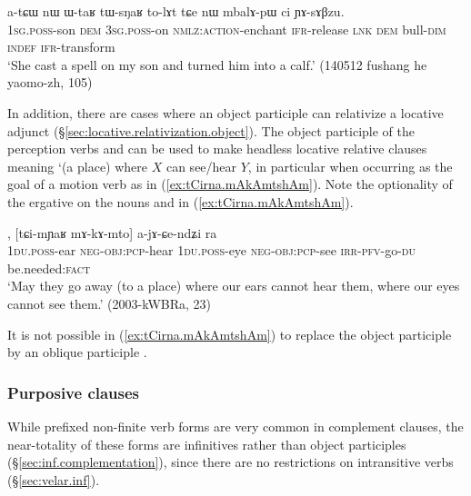 \begin{exe}
\ex \label{ex:WtaR.tWsNaR.tolAt}
\gll  a-tɕɯ nɯ ɯ-taʁ tɯ-sŋaʁ to-lɤt tɕe nɯ mbalɤ-pɯ ci ɲɤ-sɤβzu. \\
\textsc{1sg}.\textsc{poss}-son \textsc{dem} \textsc{3sg}.\textsc{poss}-on \textsc{nmlz}:\textsc{action}-enchant \textsc{ifr}-release \textsc{lnk} \textsc{dem} bull-\textsc{dim} \textsc{indef} \textsc{ifr}-transform \\
\glt `She cast a spell on my son and turned him into a calf.' (140512 fushang he yaomo-zh, 105)
\end{exe}
 
In addition, there are cases where an object participle can relativize a locative adjunct (§\ref{sec:locative.relativization.object}). The object participle of the perception verbs  and  can be used to make headless locative relative clauses meaning `(a place) where $X$ can see/hear $Y$, in particular when occurring as the goal of a motion verb as in (\ref{ex:tCirna.mAkAmtshAm}). Note the optionality of the ergative on the nouns  and  in (\ref{ex:tCirna.mAkAmtshAm}). 

\begin{exe}
\ex \label{ex:tCirna.mAkAmtshAm}
, [tɕi-mɲaʁ mɤ-kɤ-mto] a-jɤ-ɕe-ndʑi ra \\
\textsc{1du}.\textsc{poss}-ear \textsc{neg}-\textsc{obj}:\textsc{pcp}-hear \textsc{1du}.\textsc{poss}-eye \textsc{neg}-\textsc{obj}:\textsc{pcp}-see \textsc{irr}-\textsc{pfv}-go-\textsc{du} be.needed:\textsc{fact} \\
\glt  `May they go away (to a place) where our ears cannot hear them, where our eyes cannot see them.' (2003-kWBRa, 23)
\end{exe}

It is not possible in (\ref{ex:tCirna.mAkAmtshAm}) to replace the object participle by an oblique participle .

\subsubsection{Purposive clauses} \label{sec:object.participles.complement}
While  prefixed non-finite verb forms are very common in complement clauses, the near-totality of these forms are infinitives rather than object participles (§\ref{sec:inf.complementation}), since there are no restrictions on intransitive verbs (§\ref{sec:velar.inf}).

